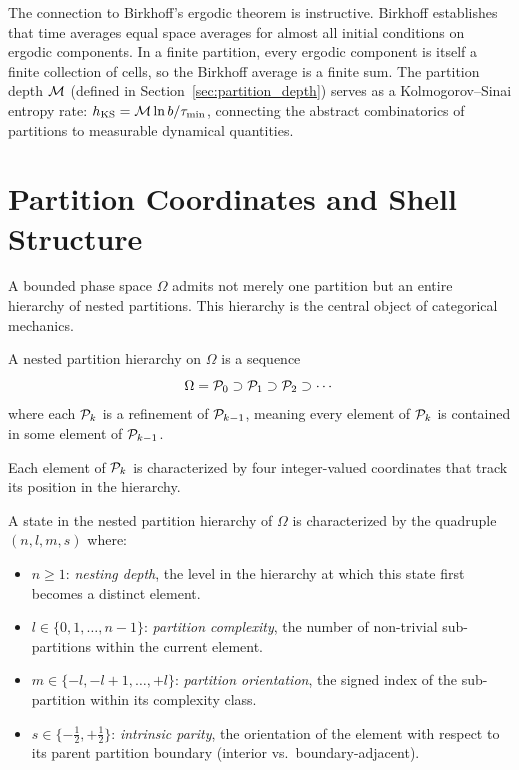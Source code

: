 The connection to Birkhoff's ergodic theorem is instructive. Birkhoff establishes
that time averages equal space averages for almost all initial conditions on
ergodic components. In a finite partition, every ergodic component is itself
a finite collection of cells, so the Birkhoff average is a finite sum. The
partition depth $\mathcal{M}$ (defined in Section~\ref{sec:partition_depth}) serves
as a Kolmogorov--Sinai entropy rate: $h_{\mathrm{KS}} = \mathcal{M} \ln b / \tau_{\min}$,
connecting the abstract combinatorics of partitions to measurable dynamical
quantities.

\section{Partition Coordinates and Shell Structure}
\label{sec:partition_coordinates}

A bounded phase space $\Omega$ admits not merely one partition but an entire
hierarchy of nested partitions. This hierarchy is the central object of
categorical mechanics.

\begin{definition}
\label{def:nested_partition}
A nested partition hierarchy on $\Omega$ is a sequence
\[
  \Omega = \mathcal{P}_0 \supset \mathcal{P}_1 \supset \mathcal{P}_2 \supset \cdots
\]
where each $\mathcal{P}_k$ is a refinement of $\mathcal{P}_{k-1}$, meaning every element
of $\mathcal{P}_k$ is contained in some element of $\mathcal{P}_{k-1}$.
\end{definition}

Each element of $\mathcal{P}_k$ is characterized by four integer-valued coordinates
that track its position in the hierarchy.

\begin{definition}
\label{def:partition_coordinates}
A state in the nested partition hierarchy of $\Omega$ is characterized by the
quadruple $(n, l, m, s)$ where:
\begin{itemize}
  \item $n \geq 1$: \emph{nesting depth}, the level in the hierarchy at which
        this state first becomes a distinct element.
  \item $l \in \{0, 1, \ldots, n-1\}$: \emph{partition complexity}, the number
        of non-trivial sub-partitions within the current element.
  \item $m \in \{-l, -l+1, \ldots, +l\}$: \emph{partition orientation},
        the signed index of the sub-partition within its complexity class.
  \item $s \in \{-\tfrac{1}{2}, +\tfrac{1}{2}\}$: \emph{intrinsic parity},
        the orientation of the element with respect to its parent partition
        boundary (interior vs.\ boundary-adjacent).
\end{itemize}
\end{definition}

